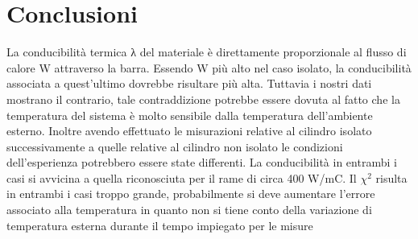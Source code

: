 \documentclass{article}
\begin{document}
	\section{Conclusioni}
		La conducibilità termica λ del materiale \`{e} direttamente proporzionale al flusso di calore W attraverso la barra. Essendo W più alto nel caso isolato, la conducibilit\`{a} associata a quest'ultimo dovrebbe risultare più alta.
		Tuttavia i nostri dati mostrano il contrario, tale contraddizione potrebbe essere dovuta al fatto che la temperatura del sistema \`{e} molto sensibile dalla temperatura dell'ambiente esterno. Inoltre avendo effettuato le misurazioni relative al cilindro isolato successivamente a quelle relative al cilindro non isolato le condizioni dell'esperienza potrebbero essere state differenti. La conducibilità in entrambi i casi si avvicina a quella riconosciuta per il rame di circa 400 W/mC. Il $\chi^2$ risulta in entrambi i casi troppo grande, probabilmente si deve aumentare l'errore associato alla temperatura in quanto non si tiene conto della variazione di temperatura esterna durante il tempo impiegato per le misure
		
\end{document}
